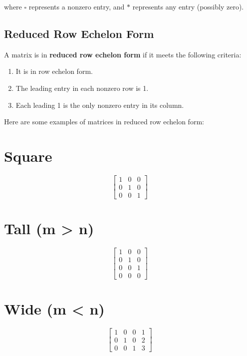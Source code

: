 \documentclass[
  letterpaper,
  DIV=11,
  numbers=noendperiod]{scrreprt}
\providecommand{\tightlist}{%
  \setlength{\itemsep}{0pt}\setlength{\parskip}{0pt}}\usepackage{longtable,booktabs,array}
\begin{document}
where \(\square\) represents a nonzero entry, and \(*\) represents any
entry (possibly zero).

\hypertarget{reduced-row-echelon-form}{%
\section*{Reduced Row Echelon Form}\label{reduced-row-echelon-form}}


A matrix is in \textbf{reduced row echelon form} if it meets the
following criteria:

\begin{enumerate}
\def\labelenumi{\arabic{enumi}.}
\tightlist
\item
  It is in row echelon form.
\item
  The leading entry in each nonzero row is 1.
\item
  Each leading 1 is the only nonzero entry in its column.
\end{enumerate}

Here are some examples of matrices in reduced row echelon form:

\chapter{Square}

\[
\begin{bmatrix}
    1 & 0 & 0 \\
    0 & 1 & 0 \\
    0 & 0 & 1 
\end{bmatrix}
\]

\chapter{Tall (m \textgreater{} n)}

\[
\begin{bmatrix}
    1 & 0 & 0 \\
    0 & 1 & 0 \\
    0 & 0 & 1 \\
    0 & 0 & 0
\end{bmatrix}
\]

\chapter{Wide (m \textless{} n)}

\[
\begin{bmatrix}
  1 & 0 & 0 & 1 \\
  0 & 1 & 0 & 2 \\
  0 & 0 & 1 & 3
\end{bmatrix}
\]
\end{document}
